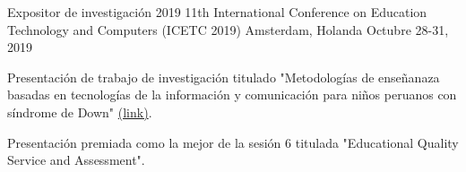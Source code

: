 

\begin{cventries}

  \cventry
    {Expositor de investigación} %
    {2019 11th International Conference on Education Technology and Computers (ICETC 2019)} %
    {Amsterdam, Holanda} %
    {Octubre 28-31, 2019} %
    {
      \begin{cvitems} %
        \item {Presentación de trabajo de investigación titulado "Metodologías de enseñanaza basadas en tecnologías de la información y comunicación para niños peruanos con síndrome de Down" \href{https://dl.acm.org/doi/abs/10.1145/3369255.3369270}{(link)}.}
        \item {Presentación premiada como la mejor de la sesión 6 titulada "Educational Quality Service and Assessment".}
      \end{cvitems}
    }

\end{cventries}
